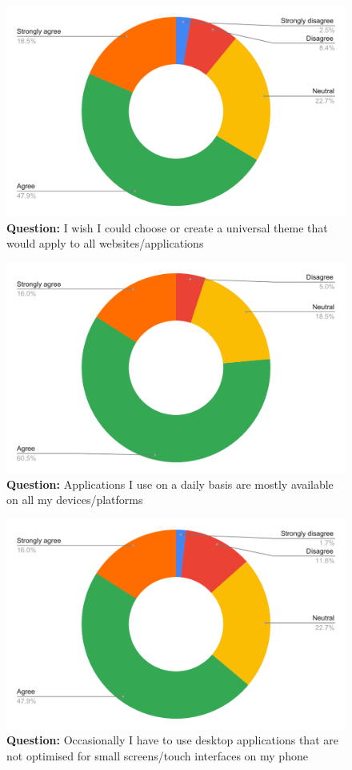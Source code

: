 \begin{figure}[H]
  \centering
  \includegraphics[width=13cm]{thesis/paper/images/p1_q9.pdf}
  \textbf{Question:} I wish I could choose or create a universal theme that would apply to all websites/applications
\end{figure}

\begin{figure}[H]
  \centering
  \includegraphics[width=13cm]{thesis/paper/images/p1_q10.pdf}
  \textbf{Question:} Applications I use on a daily basis are mostly available on all my devices/platforms
\end{figure}

\begin{figure}[H]
  \centering
  \includegraphics[width=13cm]{thesis/paper/images/p1_q11.pdf}
  \textbf{Question:} Occasionally I have to use desktop applications that are not optimised for small screens/touch interfaces on my phone
\end{figure}

